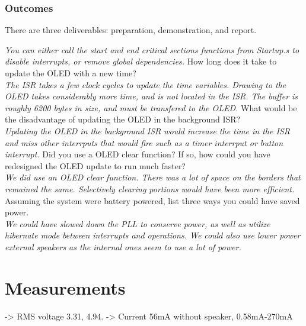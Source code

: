 \documentclass[twoside]{article}
\begin{document}
\subsubsection{Outcomes} 
There are three deliverables: preparation, demonstration, and report. 
\begin{pset}
    \textit{You can either call the start and end critical sections functions from Startup.s to disable interrupts, or remove global dependencies.}
	How long does it take to update the OLED with a new time?\\
    \textit{The ISR takes a few clock cycles to update the time variables. Drawing to the OLED takes considerably more time, and is not located in the ISR. The buffer is roughly 6200 bytes in size, and must be transfered to the OLED.}
  	What would be the disadvantage of updating the OLED in the background ISR?\\
    \textit{Updating the OLED in the background ISR would increase the time in the ISR and miss other interrputs that would fire such as a timer interrput or button interrupt.}
	Did you use a OLED clear function? If so, how could you have redesigned the OLED update to run much faster?\\
    \textit{We did use an OLED clear function. There was a lot of space on the borders that remained the same. Selectively clearing portions would have been more efficient.}
	Assuming the system were battery powered, list three ways you could have saved power.\\
    \textit{We could have slowed down the PLL to conserve power, as well as utilize hibernate mode between interrupts and operations. We could also use lower power external speakers as the internal ones seem to use a lot of power. }

\end{pset}
\section*{Measurements}
-> RMS voltage 3.31, 4.94.
-> Current 56mA without speaker, 0.58mA-270mA
\end{document}
